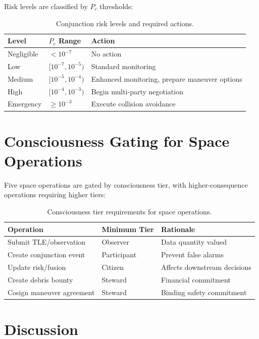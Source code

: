 \documentclass[12pt]{book}
\begin{document}
Risk levels are classified by $P_c$ thresholds:

\begin{table}[H]
\centering
\caption{Conjunction risk levels and required actions.}
\label{tab:risk-levels}
\begin{tabular}{llp{6cm}}
\toprule
\textbf{Level} & \textbf{$P_c$ Range} & \textbf{Action} \\
\midrule
Negligible & $< 10^{-7}$ & No action \\
Low & $[10^{-7}, 10^{-5})$ & Standard monitoring \\
Medium & $[10^{-5}, 10^{-4})$ & Enhanced monitoring, prepare maneuver options \\
High & $[10^{-4}, 10^{-3})$ & Begin multi-party negotiation \\
Emergency & $\geq 10^{-3}$ & Execute collision avoidance \\
\bottomrule
\end{tabular}
\end{table}

\section{Consciousness Gating for Space Operations}

Five space operations are gated by consciousness tier, with higher-consequence operations requiring higher tiers:

\begin{table}[H]
\centering
\caption{Consciousness tier requirements for space operations.}
\label{tab:space-gating}
\begin{tabular}{llp{5cm}}
\toprule
\textbf{Operation} & \textbf{Minimum Tier} & \textbf{Rationale} \\
\midrule
Submit TLE/observation & Observer & Data quantity valued \\
Create conjunction event & Participant & Prevent false alarms \\
Update risk/fusion & Citizen & Affects downstream decisions \\
Create debris bounty & Steward & Financial commitment \\
Cosign maneuver agreement & Steward & Binding safety commitment \\
\bottomrule
\end{tabular}
\end{table}

\section{Discussion}
\end{document}

